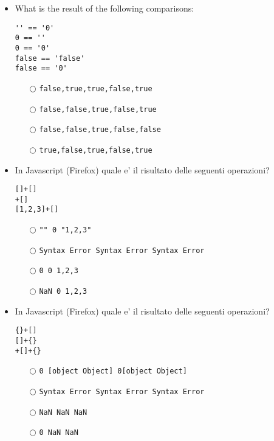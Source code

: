 \documentclass[10pt,twocolumn]{article}
\begin{document}
\begin{itemize}
    \item What is the result of the following comparisons:
          \begin{verbatim}
'' == '0'
0 == ''
0 == '0' 
false == 'false'
false == '0'
\end{verbatim}
          \begin{itemize}
              \item[$\bigcirc$] \verb=false,true,true,false,true=
              \item[$\bigcirc$] \verb=false,false,true,false,true=
              \item[$\bigcirc$] \verb=false,false,true,false,false=
              \item[$\bigcirc$] \verb=true,false,true,false,true=
          \end{itemize}
\end{itemize}
\begin{itemize}
    \item In Javascript (Firefox) quale e' il risultato delle seguenti operazioni?
          \begin{verbatim}
[]+[]
+[]
[1,2,3]+[] 
\end{verbatim}
          \begin{itemize}
              \item[$\bigcirc$] \verb="" 0 "1,2,3"=
              \item[$\bigcirc$] \verb=Syntax Error Syntax Error Syntax Error=
              \item[$\bigcirc$] \verb=0 0 1,2,3=
              \item[$\bigcirc$] \verb=NaN 0 1,2,3=
          \end{itemize}
\end{itemize}
\begin{itemize}
    \item In Javascript (Firefox) quale e' il risultato delle seguenti operazioni?
          \begin{verbatim}
{}+[]
[]+{}
+[]+{} 
\end{verbatim}
          \begin{itemize}
              \item[$\bigcirc$] \verb=0 [object Object] 0[object Object]=
              \item[$\bigcirc$] \verb=Syntax Error Syntax Error Syntax Error=
              \item[$\bigcirc$] \verb=NaN NaN NaN=
              \item[$\bigcirc$] \verb=0 NaN NaN=
          \end{itemize}
\end{itemize}
\end{document}
